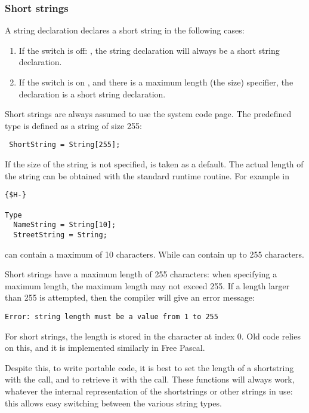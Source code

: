 \subsubsection{Short strings}
 
A string declaration declares a short string in the following cases:
\begin{enumerate}
\item If the  switch is off: , the string declaration will always be a short string declaration.
\item If the switch is on , and there is a maximum length (the size) specifier, the declaration is a short
string declaration.
\end{enumerate}
Short strings are always assumed to use the system code page.
The predefined type  is defined as a string of size 255:
\begin{verbatim}
 ShortString = String[255];
\end{verbatim}
If the size of the string is not specified,  is taken as a default.
The actual length of the string can be obtained with the
 standard runtime routine.
For example in
\begin{verbatim}
{$H-}

Type
  NameString = String[10];
  StreetString = String;
\end{verbatim}
 can contain a maximum of 10 characters. While
 can contain up to 255 characters.

\begin{remark}
Short strings have a maximum length of 255 characters: when specifying a
maximum length, the maximum length may not exceed 255. If a length larger
than 255 is attempted, then the compiler will give an error message:
\begin{verbatim}
Error: string length must be a value from 1 to 255
\end{verbatim}

For short strings, the length is stored in the character at index 0. Old
\tp code relies on this, and it is implemented similarly in Free Pascal.

Despite this, to write portable code, it is best to set the length of a
shortstring  with the  call, and to retrieve
it with the  call.  These functions will always work, whatever
the internal representation of the shortstrings or other strings in use:
this allows easy switching between the various string types.
\end{remark}

